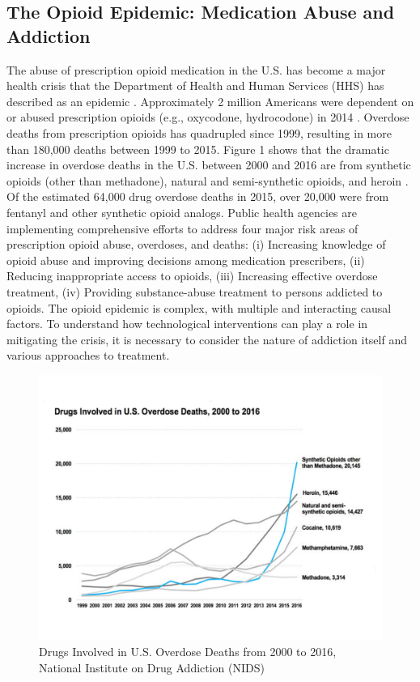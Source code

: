 \documentclass[sigconf]{acmart}
\begin{document}
\subsection{The Opioid Epidemic: Medication Abuse and Addiction} 

The abuse of prescription opioid medication in the U.S. has become a major health 
crisis that the Department of Health and Human Services (HHS) has described as an 
epidemic \cite{volkow14}. Approximately 2 million Americans were dependent on 
or abused prescription opioids (e.g., oxycodone, hydrocodone) in 2014 \cite{cdc17}. 
Overdose deaths from prescription opioids has quadrupled since 1999, resulting in 
more than 180,000 deaths between 1999 to 2015. Figure 1 shows that the dramatic 
increase in overdose deaths in the U.S. between 2000 and 2016 are from synthetic 
opioids (other than methadone), natural and semi-synthetic opioids, and heroin 
\cite{nida17}. Of the estimated 64,000 drug overdose deaths in 2015, over 20,000 
were from fentanyl and other synthetic opioid analogs. Public health agencies 
are implementing comprehensive efforts to address four major risk areas of
prescription opioid abuse, overdoses, and deaths: (i) Increasing knowledge of 
opioid abuse and improving decisions among medication prescribers, (ii) Reducing 
inappropriate access to opioids, (iii) Increasing effective overdose treatment, 
(iv) Providing substance-abuse treatment to persons addicted to opioids. The 
opioid epidemic is complex, with multiple and interacting causal factors. To 
understand how technological interventions can play a role in mitigating the 
crisis, it is necessary to consider the nature of addiction itself and 
various approaches to treatment. 

\begin{figure}[!ht]
  \centering\includegraphics[width=\columnwidth]{images/Figure1.pdf}
  \caption{Drugs Involved in U.S. Overdose Deaths from 2000 to 2016, 
  National Institute on Drug Addiction (NIDS) \cite{nida17}
  }\label{f:Figure1}
\end{figure}
\end{document}
